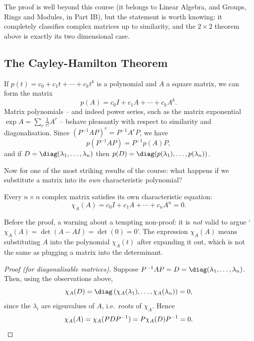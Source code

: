 The proof is well beyond this course (it belongs to Linear Algebra, and Groups, Rings and Modules, in Part IB), but the statement is worth knowing: it completely classifies complex matrices up to similarity, and the $2 \times 2$ theorem above is exactly its two dimensional case.

\subsection{The Cayley-Hamilton Theorem}

If $p(t) = c_0 + c_1 t + \cdots + c_kt^k$ is a polynomial and $A$ a square matrix, we can form the matrix
$$
p(A) = c_0 I + c_1 A + \cdots + c_k A^k.
$$
Matrix polynomials -- and indeed power series, such as the matrix exponential $\exp A = \sum_r \frac{1}{r!}A^r$ -- behave pleasantly with respect to similarity and diagonalisation. Since $(P^{-1}AP)^r = P^{-1}A^rP$, we have
$$
p(P^{-1}AP) = P^{-1}p(A)P,
$$
and if $D = \diag(\lambda_1, \dots, \lambda_n)$ then $p(D) = \diag(p(\lambda_1), \dots, p(\lambda_n))$.

Now for one of the most striking results of the course: what happens if we substitute a matrix into its \emph{own} characteristic polynomial?

\begin{theorem}
	Every $n \times n$ complex matrix satisfies its own characteristic equation:
	$$
	\chi_A(A) = c_0 I + c_1 A + \cdots + c_n A^n = 0.
	$$
\end{theorem}

Before the proof, a warning about a tempting non-proof: it is \emph{not} valid to argue `$\chi_A(A) = \det(A - AI) = \det(0) = 0$'. The expression $\chi_A(A)$ means substituting $A$ into the polynomial $\chi_A(t)$ after expanding it out, which is not the same as plugging a matrix into the determinant.

\begin{proof}[Proof (for diagonalisable matrices)]
	Suppose $P^{-1}AP = D = \diag(\lambda_1, \dots, \lambda_n)$. Then, using the observations above,
	$$
	\chi_A(D) = \diag\left(\chi_A(\lambda_1), \dots, \chi_A(\lambda_n)\right) = 0,
	$$
	since the $\lambda_i$ are eigenvalues of $A$, i.e.\ roots of $\chi_A$. Hence
	$$
	\chi_A(A) = \chi_A(PDP^{-1}) = P \chi_A(D)P^{-1} = 0. \qedhere
	$$
\end{proof}

